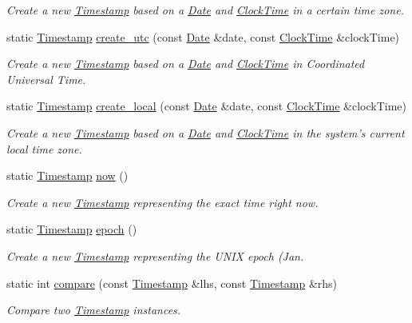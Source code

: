 \begin{DoxyCompactItemize}
\begin{DoxyCompactList}\small\item\em Create a new \hyperlink{structTimestamp}{Timestamp} based on a \hyperlink{structDate}{Date} and \hyperlink{structClockTime}{Clock\-Time} in a certain time zone. \end{DoxyCompactList}\item 
static \hyperlink{structTimestamp}{Timestamp} \hyperlink{structTimestamp_af18efc9b0db5803b00019e6e3f01895a}{create\-\_\-utc} (const \hyperlink{structDate}{Date} \&date, const \hyperlink{structClockTime}{Clock\-Time} \&clock\-Time)
\begin{DoxyCompactList}\small\item\em Create a new \hyperlink{structTimestamp}{Timestamp} based on a \hyperlink{structDate}{Date} and \hyperlink{structClockTime}{Clock\-Time} in Coordinated Universal Time. \end{DoxyCompactList}\item 
static \hyperlink{structTimestamp}{Timestamp} \hyperlink{structTimestamp_acaa4f082d3a38dc42c8d815925add8a5}{create\-\_\-local} (const \hyperlink{structDate}{Date} \&date, const \hyperlink{structClockTime}{Clock\-Time} \&clock\-Time)
\begin{DoxyCompactList}\small\item\em Create a new \hyperlink{structTimestamp}{Timestamp} based on a \hyperlink{structDate}{Date} and \hyperlink{structClockTime}{Clock\-Time} in the system's current local time zone. \end{DoxyCompactList}\item 
static \hyperlink{structTimestamp}{Timestamp} \hyperlink{structTimestamp_ab2b17140c0c966ad672395f3f90b8653}{now} ()
\begin{DoxyCompactList}\small\item\em Create a new \hyperlink{structTimestamp}{Timestamp} representing the exact time right now. \end{DoxyCompactList}\item 
static \hyperlink{structTimestamp}{Timestamp} \hyperlink{structTimestamp_aa2f108710dbe1372d8fc7146a2e66c37}{epoch} ()
\begin{DoxyCompactList}\small\item\em Create a new \hyperlink{structTimestamp}{Timestamp} representing the U\-N\-I\-X epoch (Jan. \end{DoxyCompactList}\item 
static int \hyperlink{structTimestamp_a64216c9061a4449c8d3fb9d1fecbb4a0}{compare} (const \hyperlink{structTimestamp}{Timestamp} \&lhs, const \hyperlink{structTimestamp}{Timestamp} \&rhs)
\begin{DoxyCompactList}\small\item\em Compare two \hyperlink{structTimestamp}{Timestamp} instances. \end{DoxyCompactList}\end{DoxyCompactItemize}
